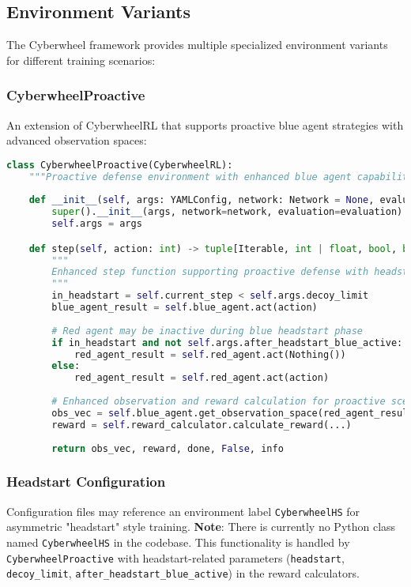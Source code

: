 \documentclass[12pt,a4paper]{article}
\begin{document}
\subsection{Environment Variants}

The Cyberwheel framework provides multiple specialized environment variants for different training scenarios:

\subsubsection{CyberwheelProactive}
An extension of CyberwheelRL that supports proactive blue agent strategies with advanced observation spaces:

\begin{lstlisting}[language=Python, caption=CyberwheelProactive Implementation]
class CyberwheelProactive(CyberwheelRL):
    """Proactive defense environment with enhanced blue agent capabilities"""
    
    def __init__(self, args: YAMLConfig, network: Network = None, evaluation: bool = False):
        super().__init__(args, network=network, evaluation=evaluation)
        self.args = args

    def step(self, action: int) -> tuple[Iterable, int | float, bool, bool, dict[str, Any]]:
        """
        Enhanced step function supporting proactive defense with headstart mechanism
        """
        in_headstart = self.current_step < self.args.decoy_limit
        blue_agent_result = self.blue_agent.act(action)
        
        # Red agent may be inactive during blue headstart phase
        if in_headstart and not self.args.after_headstart_blue_active:
            red_agent_result = self.red_agent.act(Nothing())
        else:
            red_agent_result = self.red_agent.act(action)
            
        # Enhanced observation and reward calculation for proactive scenarios
        obs_vec = self.blue_agent.get_observation_space(red_agent_result)
        reward = self.reward_calculator.calculate_reward(...)
        
        return obs_vec, reward, done, False, info
\end{lstlisting}

\subsubsection{Headstart Configuration}
Configuration files may reference an environment label \texttt{CyberwheelHS} for asymmetric "headstart" style training. \textbf{Note}: There is currently no Python class named \texttt{CyberwheelHS} in the codebase. This functionality is handled by \texttt{CyberwheelProactive} with headstart-related parameters (\texttt{headstart}, \texttt{decoy\_limit}, \texttt{after\_headstart\_blue\_active}) in the reward calculators.
\end{document}
